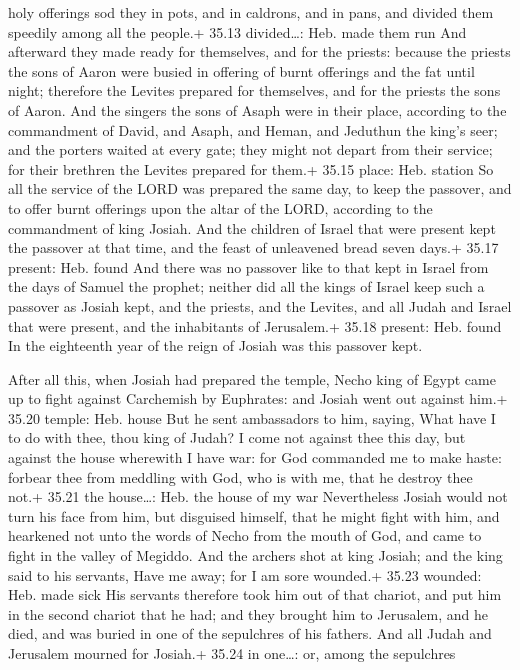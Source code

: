 holy offerings sod they in pots, and in caldrons, and in pans, and
divided them speedily among all the people.+ 35.13 divided\ldots: Heb.
made them run  And afterward they made ready for
themselves, and for the priests: because the priests the sons of Aaron
were busied in offering of burnt offerings and the fat until night;
therefore the Levites prepared for themselves, and for the priests the
sons of Aaron.  And the singers the sons of Asaph were in
their place, according to the commandment of David, and Asaph, and
Heman, and Jeduthun the king's seer; and the porters waited at every
gate; they might not depart from their service; for their brethren the
Levites prepared for them.+ 35.15 place: Heb. station  So
all the service of the LORD was prepared the same day, to keep the
passover, and to offer burnt offerings upon the altar of the LORD,
according to the commandment of king Josiah.  And the
children of Israel that were present kept the passover at that time, and
the feast of unleavened bread seven days.+ 35.17 present: Heb. found
 And there was no passover like to that kept in Israel from
the days of Samuel the prophet; neither did all the kings of Israel keep
such a passover as Josiah kept, and the priests, and the Levites, and
all Judah and Israel that were present, and the inhabitants of
Jerusalem.+ 35.18 present: Heb. found  In the eighteenth
year of the reign of Josiah was this passover kept.

 After all this, when Josiah had prepared the temple,
Necho king of Egypt came up to fight against Carchemish by Euphrates:
and Josiah went out against him.+ 35.20 temple: Heb. house 
But he sent ambassadors to him, saying, What have I to do with thee,
thou king of Judah? I come not against thee this day, but against the
house wherewith I have war: for God commanded me to make haste: forbear
thee from meddling with God, who is with me, that he destroy thee not.+
35.21 the house\ldots: Heb. the house of my war 
Nevertheless Josiah would not turn his face from him, but disguised
himself, that he might fight with him, and hearkened not unto the words
of Necho from the mouth of God, and came to fight in the valley of
Megiddo.  And the archers shot at king Josiah; and the king
said to his servants, Have me away; for I am sore wounded.+ 35.23
wounded: Heb. made sick  His servants therefore took him
out of that chariot, and put him in the second chariot that he had; and
they brought him to Jerusalem, and he died, and was buried in one of the
sepulchres of his fathers. And all Judah and Jerusalem mourned for
Josiah.+ 35.24 in one\ldots: or, among the sepulchres

